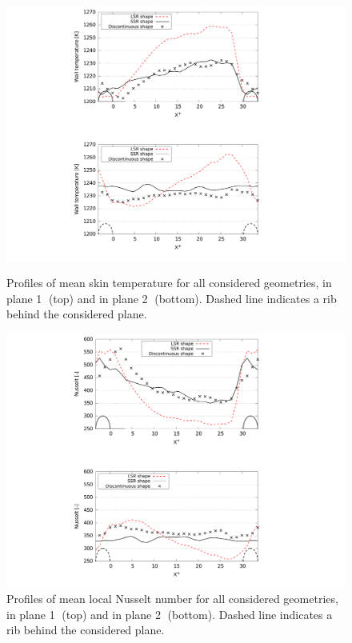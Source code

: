 \begin{figure}[h]
\begin{minipage}[c]{1.0\linewidth}
\centering
\includegraphics[width=\linewidth]{fig/applications/optim/Twall_profile_compare.pdf}
\caption{Profiles of mean skin temperature for all considered geometries, in plane \textcircled{1} (top) and in plane \textcircled{2} (bottom). Dashed line indicates a rib behind the considered plane.}
\label{Twall_profile_compare}
\end{minipage}

\begin{minipage}[c]{1.0\linewidth}
\centering
\includegraphics[width=\linewidth]{fig/applications/optim/Nusselt_compare.pdf}
\caption{Profiles of mean local Nusselt number for all considered geometries, in plane \textcircled{1} (top) and in plane \textcircled{2} (bottom). Dashed line indicates a rib behind the considered plane.}
\label{Nusselt_compare}
\end{minipage}
\end{figure}

